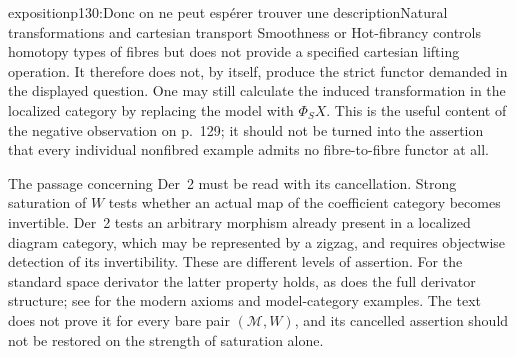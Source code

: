 \begin{dcomment}{exposition}{p130:Donc on ne peut espérer trouver une description}{Natural transformations and cartesian transport}
Smoothness or Hot-fibrancy controls homotopy types of fibres but does not provide a specified cartesian lifting operation. It therefore does not, by itself, produce the strict functor demanded in the displayed question. One may still calculate the induced transformation in the localized category by replacing the model with $\Phi_SX$. This is the useful content of the negative observation on p.~129; it should not be turned into the assertion that every individual nonfibred example admits no fibre-to-fibre functor at all.

The passage concerning Der~2 must be read with its cancellation. Strong saturation of $W$ tests whether an actual map of the coefficient category becomes invertible. Der~2 tests an arbitrary morphism already present in a localized diagram category, which may be represented by a zigzag, and requires objectwise detection of its invertibility. These are different levels of assertion. For the standard space derivator the latter property holds, as does the full derivator structure; see \citet[Proposition~1.30]{Groth2013} for the modern axioms and model-category examples. The text does not prove it for every bare pair $(\mathcal M,W)$, and its cancelled assertion should not be restored on the strength of saturation alone.
\end{dcomment}

